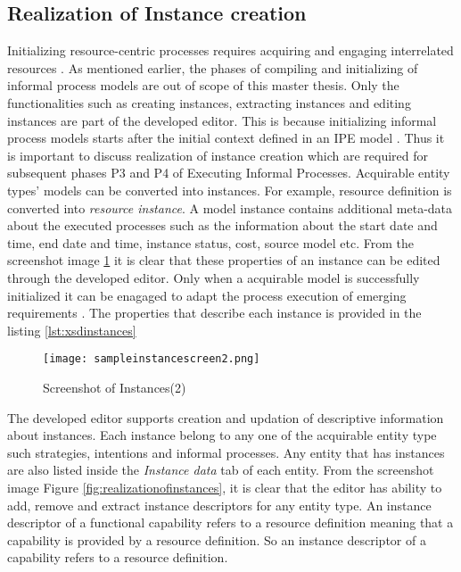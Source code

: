 \subsection{Realization of Instance creation}
Initializing resource-centric processes requires acquiring and engaging interrelated resources \cite{Sungur2015}. As mentioned earlier, the phases of compiling and initializing of informal process models are out of scope of this master thesis. Only the functionalities such as creating instances, extracting instances and editing instances are part of the developed editor. This is because initializing informal process models starts after the initial context defined in an IPE model \cite{Sungur2015}. Thus it is important to discuss realization of instance creation which are required for subsequent phases P3 and P4 of Executing Informal Processes. Acquirable entity types' models can be converted into instances. For example, resource definition is converted into \textit{resource instance}. A model instance contains additional meta-data about the executed processes such as the information about the start date and time, end date and time, instance status, cost, source model etc. From the screenshot image \ref{fig:realizationofinstances2} it is clear that these properties of an instance can be edited through the developed editor. Only when a acquirable model is successfully initialized it can be enagaged to adapt the process execution of emerging requirements \cite{Sungur2015}. The properties that describe each instance is provided in the listing \ref{lst:xsdinstances}

\begin{figure}
	\centering
	\texttt{[image: sampleinstancescreen2.png]}
	\caption{Screenshot of Instances(2)}
	\label{fig:realizationofinstances2}
\end{figure}

The developed editor supports creation and updation of descriptive information about instances. Each instance belong to any one of the acquirable entity type such strategies, intentions and informal processes. Any entity that has instances are also listed inside the \textit{Instance data} tab of each entity. From the screenshot image Figure \ref{fig:realizationofinstances}, it is clear that the editor has ability to add, remove and extract instance descriptors for any entity type. An instance descriptor of a functional capability refers to a resource definition meaning that a capability is provided by a resource definition. So an instance descriptor of a capability refers to a resource definition.

